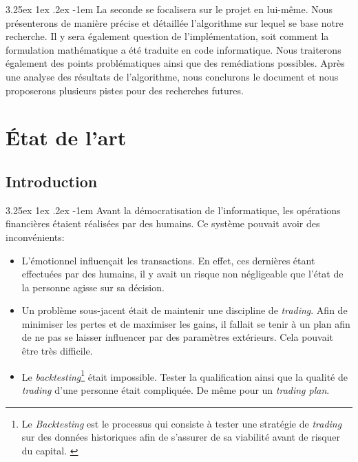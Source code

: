 \documentclass[a4paper, 11pt]{article}
\makeatletter
\renewcommand\paragraph{\@startsection{paragraph}{5}{\z@}%
  {3.25ex \@plus1ex \@minus.2ex}%
  {-1em}%
  {\normalfont\normalsize\bfseries}}
\makeatother
\begin{document}
\paragraph{}
La seconde se focalisera sur le projet en lui-même. Nous présenterons de manière précise et détaillée l'algorithme sur lequel se base notre recherche. Il y sera également question de l'implémentation, soit comment la formulation mathématique a été traduite en code informatique. Nous traiterons également des points problématiques ainsi que des remédiations possibles. Après une analyse des résultats de l'algorithme, nous conclurons le document et nous proposerons plusieurs pistes pour des recherches futures.


\section{État de l'art}
\subsection{Introduction}
\paragraph{}
Avant la démocratisation de l'informatique, les opérations financières étaient réalisées par des humains. 
Ce système pouvait avoir des inconvénients:
\begin{itemize}
\item L'émotionnel influençait les transactions. En effet, ces dernières étant effectuées par des humains, 
il y avait un risque non négligeable que l'état de la personne agisse sur sa décision.

\item Un problème sous-jacent était de maintenir une discipline de \textit{trading}. 
Afin de minimiser les pertes et de maximiser les gains, il fallait se tenir à un plan afin de ne pas se laisser 
influencer par des paramètres extérieurs. Cela pouvait être très difficile.

\item Le \textit{backtesting}\footnote{Le \textit{Backtesting} est le processus qui consiste à tester une stratégie
de \textit{trading} sur des données historiques afin de s'assurer de sa viabilité avant de risquer du capital.
\cite{investopedia_backtesting}} 
était impossible. Tester la qualification ainsi que la qualité de \textit{trading} d'une personne était compliquée. 
De même pour un \textit{trading plan}.
\end{itemize}
\end{document}
